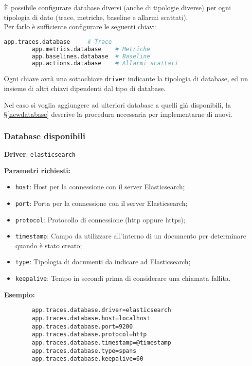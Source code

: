 		È possibile configurare database diversi (anche di tipologie diverse) per ogni tipologia di dato 
		(trace, metriche, baseline e allarmi scattati).\\
		Per farlo è sufficiente configurare le seguenti chiavi:\\
		\begin{lstlisting}[language=Python]
		app.traces.database     # Trace
		app.metrics.database    # Metriche
		app.baselines.database  # Baseline
		app.actions.database    # Allarmi scattati
		\end{lstlisting}

		Ogni chiave avrà una sottochiave \lstinline[columns=fixed]{driver} indicante la tipologia di database, 
		ed un insieme di altri chiavi dipendenti dal tipo di database.

		Nel caso si voglia aggiungere ad \ProjectName{} ulteriori database a quelli già disponibili,
		la §\ref{newdatabase} descrive la procedura necessaria per implementarne di nuovi.

		\subsubsection{Database disponibili}


				\textbf{Driver}: \lstinline[columns=fixed]{elasticsearch}

				\textbf{Parametri richiesti:}
				\begin{itemize}
					\item \lstinline[columns=fixed]{host}: Host per la connessione con il server Elasticsearch;
					\item \lstinline[columns=fixed]{port}: Porta per la connessione con il server Elasticsearch;
					\item \lstinline[columns=fixed]{protocol}: Protocollo di connessione (http oppure https);
					\item \lstinline[columns=fixed]{timestamp}: Campo da utilizzare all'interno di 
							un documento per determinare quando è stato creato;
					\item \lstinline[columns=fixed]{type}: Tipologia di documenti da indicare ad Elasticsearch;
					\item \lstinline[columns=fixed]{keepalive}: Tempo in secondi prima di considerare una chiamata fallita.				
				\end{itemize}
	
				\textbf{Esempio:}
				\begin{lstlisting}
		app.traces.database.driver=elasticsearch
		app.traces.database.host=localhost
		app.traces.database.port=9200
		app.traces.database.protocol=http
		app.traces.database.timestamp=@timestamp
		app.traces.database.type=spans
		app.traces.database.keepalive=60
				\end{lstlisting}

